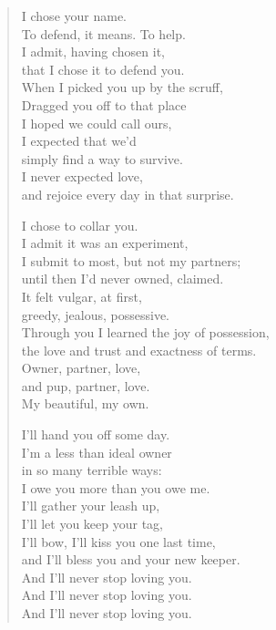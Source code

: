 \begin{verse}
I chose your name.\\
To defend, it means. To help.\\
I admit, having chosen it,\\
that I chose it to defend you.\\
When I picked you up by the scruff,\\
Dragged you off to that place\\
I hoped we could call ours,\\
I expected that we'd\\
simply find a way to survive.\\
I never expected love,\\
and rejoice every day in that surprise.

I chose to collar you.\\
I admit it was an experiment,\\
I submit to most, but not my partners;\\
until then I'd never owned, claimed.\\
It felt vulgar, at first,\\
greedy, jealous, possessive.\\
Through you I learned the joy of possession,\\
the love and trust and exactness of terms.\\
Owner, partner, love,\\
and pup, partner, love.\\
My beautiful, my own.

I'll hand you off some day.\\
I'm a less than ideal owner\\
in so many terrible ways:\\
I owe you more than you owe me.\\
I'll gather your leash up,\\
I'll let you keep your tag,\\
I'll bow, I'll kiss you one last time,\\
and I'll bless you and your new keeper.\\
And I'll never stop loving you.\\
And I'll never stop loving you.\\
And I'll never stop loving you.
\end{verse}

